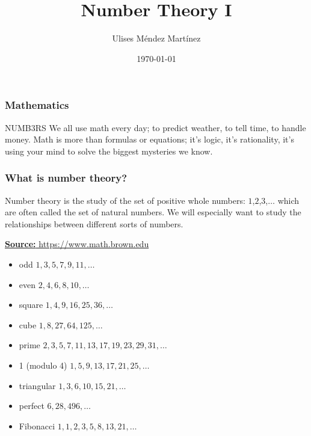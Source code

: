 \documentclass{beamer}
\title[Number Theory I]{Number Theory I} %
\author{Ulises M\'endez Mart\'{i}nez} %
\institute[UTM] %
{
Algorist Weekly Talks \\ %
\medskip
\textit{ulisesmdzmtz@gmail.com} %
}
\date{\today} %
\begin{document}
\begin{frame}
\titlepage %
\end{frame}


\begin{frame}
\frametitle{Mathematics}
\begin{block}{NUMB3RS}
We all use math every day; to predict weather, to tell time, to handle money.
Math is more than formulas or equations; it's logic, it's rationality,
it's using your mind to solve the biggest mysteries we know.
\end{block}
\end{frame}

\begin{frame}[fragile]
\frametitle{What is number theory?}
 Number theory is the study of the set of positive whole numbers: $1$,$2$,$ 3$,$ \dots $ which are often called the set of natural numbers. We will especially want to study the relationships between different sorts of numbers. 
 \begin{block} { \href{https://www.math.brown.edu/~jhs/}{\textbf{Source:} https://www.math.brown.edu}} 
\begin{itemize}
\item odd $1, 3, 5, 7, 9, 11, \dots$
\item even $ 2, 4, 6, 8, 10, \dots$
\item square $ 1, 4, 9, 16, 25, 36, \dots$
\item cube $ 1, 8, 27, 64, 125, \dots$
\item prime $ 2, 3, 5, 7, 11, 13, 17, 19, 23, 29, 31, \dots$
\item 1 (modulo 4) $ 1, 5, 9, 13, 17, 21, 25, \dots$
\item triangular $ 1, 3, 6, 10, 15, 21, \dots$
\item perfect $ 6, 28, 496, \dots$
\item Fibonacci $ 1, 1, 2, 3, 5, 8, 13, 21, \dots$
\end{itemize}
\end{block}
\end{frame}
\end{document}

